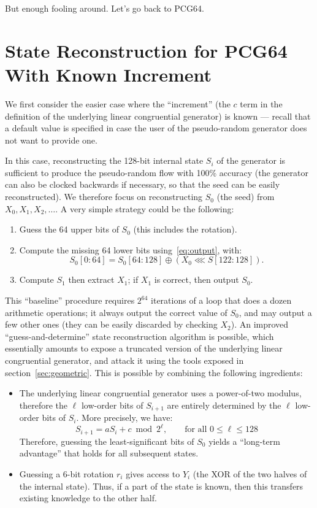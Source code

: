 \documentclass[submission,svgnames,journal=tosc]{iacrtrans}
\begin{document}
But enough fooling around. Let's go back to \textsf{PCG64}.

\section{State Reconstruction for \textsf{PCG64} With Known Increment}
\label{sec:Cknown}

We first consider the easier case where the ``increment'' (the $c$ term in the
definition of the underlying linear congruential generator) is known --- recall
that a default value is specified in case the user of the pseudo-random
generator does not want to provide one.

In this case, reconstructing the 128-bit internal state $S_i$ of the generator
is sufficient to produce the pseudo-random flow with 100\% accuracy (the
generator can also be clocked backwards if necessary, so that the seed can be
easily reconstructed). We therefore focus on reconstructing $S_0$ (the seed)
from $X_0, X_1, X_2, \dots$. A very simple strategy could be the following:
\begin{enumerate}
\item Guess the 64 upper bits of $S_0$ (this includes the rotation).
\item Compute the missing 64 lower bits using~\eqref{eq:output}, with:
\[
   S_0[0:64] = S_0[64:128] \oplus (X_0  \lll S[122:128]).
\]
\item Compute $S_1$ then extract $X_1$; if $X_1$ is correct, then output $S_0$.
\end{enumerate}

This ``baseline'' procedure requires $2^{64}$ iterations of a loop that does a
dozen arithmetic operations; it always output the correct value of $S_0$, and
may output a few other ones (they can be easily discarded by checking $X_2$). An
improved ``guess-and-determine'' state reconstruction algorithm is possible,
which essentially amounts to expose a truncated version of the underlying linear
congruential generator, and attack it using the tools exposed in
section~\ref{sec:geometric}. This is possible by combining the following
ingredients:
\begin{itemize}
\item The underlying linear congruential generator uses a power-of-two modulus,
  therefore the $\ell$ low-order bits of $S_{i+1}$ are entirely determined by
  the $\ell$ low-order bits of $S_i$. More precisely, we have:
  \begin{equation}\label{eq:lcg}
    S_{i+1} = aS_i + c \bmod 2^\ell, \qquad \text{for all } 0 \leq \ell \leq 128
  \end{equation}
  Therefore, guessing the least-significant bits of $S_0$ yields a ``long-term
  advantage'' that holds for all subsequent states.

\item Guessing a 6-bit rotation $r_i$ gives access to $Y_i$ (the XOR of the two
  halves of the internal state). Thus, if a part of the state is known, then
  this transfers existing knowledge to the other half.
\end{itemize}
\end{document}
